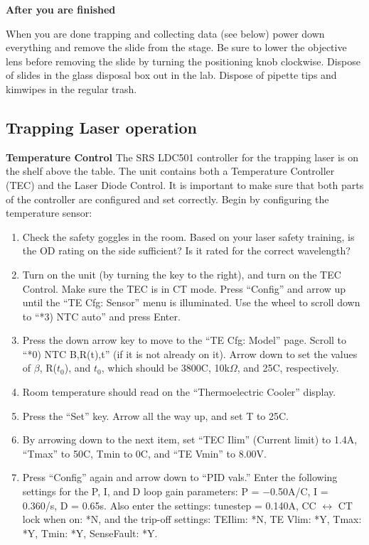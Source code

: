 \documentclass{../lab}
\begin{document}
\textbf{After you are finished}

When you are done trapping and collecting data (see below) power down everything and remove the slide from the stage. Be sure to lower the objective lens before removing the slide by turning the positioning knob clockwise.  Dispose of slides in the glass disposal box out in the lab. Dispose of pipette tips and kimwipes in the regular trash.

\subsection{Trapping Laser operation}
\label{sec:laser_operation}

\textbf{Temperature Control} The SRS LDC501 controller for the trapping laser is on the shelf above the table. The unit contains both a Temperature Controller (TEC) and the Laser Diode Control. It is important to make sure that both parts of the controller are configured and set correctly. Begin by configuring the temperature sensor:

\begin{enumerate}
    \item Check the safety goggles in the room. Based on your laser safety training, is the OD rating on the side sufficient? Is it rated for the correct wavelength?
    
    \item Turn on the unit (by turning the key to the right), and turn on the TEC Control. Make sure the TEC is in CT mode. Press ``Config'' and arrow up until the ``TE Cfg: Sensor'' menu is illuminated. Use the wheel to scroll down to ``*3) NTC auto'' and press Enter.

    \item Press the down arrow key to move to the ``TE Cfg: Model'' page. Scroll to ``*0) NTC B,R(t),t'' (if it is not already on it). Arrow down to set the values of $\beta$, R($t_0$), and $t_0$, which should be 3800C, 10k$\Omega$, and 25C, respectively.

    \item Room temperature should read on the ``Thermoelectric Cooler'' display.

    \item Press the ``Set'' key. Arrow all the way up, and set T to 25C.

    \item By arrowing down to the next item, set ``TEC Ilim'' (Current limit) to 1.4A, ``Tmax'' to 50C, Tmin to 0C, and ``TE Vmin'' to 8.00V.

    \item Press ``Config'' again and arrow down to ``PID vals.'' Enter the following settings for the P, I, and D loop gain parameters: P = $-$0.50A/C, I = 0.360/s, D = 0.65s. Also enter the settings: tunestep = 0.140A, CC $\leftrightarrow$ CT lock when on: *N, and the trip-off settings: TEIlim: *N, TE Vlim: *Y, Tmax: *Y, Tmin: *Y, SenseFault: *Y.
\end{enumerate}
\end{document}
